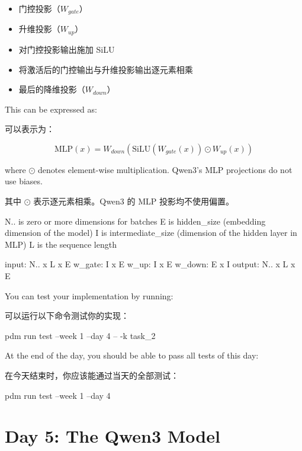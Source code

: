 \documentclass[11pt,a4paper]{article}
\newenvironment{zhpar}{%
  \par\smallskip\begingroup\color{zhcolor}\small\ignorespaces%
}{\endgroup\par\smallskip}
\begin{document}
\begin{zhpar}
\begin{itemize}[leftmargin=1.6em,itemsep=0.15em,parsep=0pt]
\item 门控投影（$W_{gate}$）
\item 升维投影（$W_{up}$）
\item 对门控投影输出施加 SiLU
\item 将激活后的门控输出与升维投影输出逐元素相乘
\item 最后的降维投影（$W_{down}$）
\end{itemize}
\end{zhpar}
This can be expressed as:

\begin{zhpar}
可以表示为：
\end{zhpar}
\[
\text{MLP}(x) = W_{down}(\text{SiLU}(W_{gate}(x)) \odot W_{up}(x))
\]

where $\odot$ denotes element-wise multiplication. Qwen3's MLP projections do not use biases.

\begin{zhpar}
其中 $\odot$ 表示逐元素相乘。Qwen3 的 MLP 投影均不使用偏置。
\end{zhpar}
\begin{codeblock}
N.. is zero or more dimensions for batches
E is hidden_size (embedding dimension of the model)
I is intermediate_size (dimension of the hidden layer in MLP)
L is the sequence length

input: N.. x L x E
w_gate: I x E
w_up: I x E
w_down: E x I
output: N.. x L x E
\end{codeblock}

You can test your implementation by running:

\begin{zhpar}
可以运行以下命令测试你的实现：
\end{zhpar}
\begin{codeblock}
pdm run test --week 1 --day 4 -- -k task_2
\end{codeblock}

At the end of the day, you should be able to pass all tests of this day:

\begin{zhpar}
在今天结束时，你应该能通过当天的全部测试：
\end{zhpar}
\begin{codeblock}
pdm run test --week 1 --day 4
\end{codeblock}

\clearpage
\section*{Day 5: The Qwen3 Model}
\end{document}
